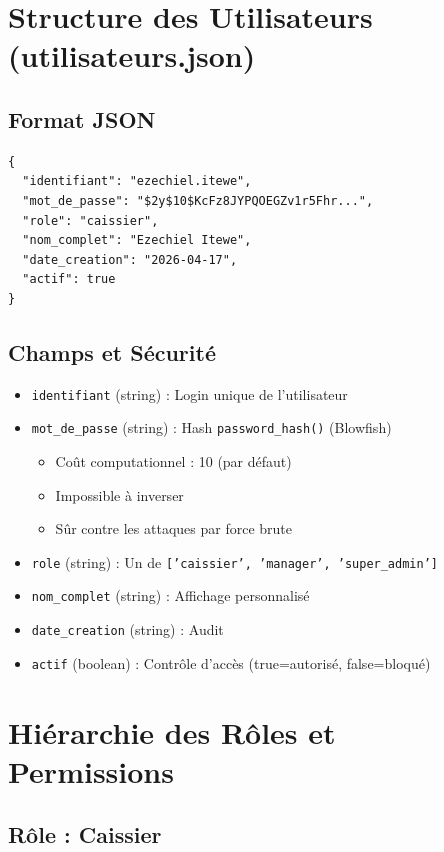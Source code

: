 \documentclass[12pt,a4paper]{report}
\begin{document}
\section{Structure des Utilisateurs (utilisateurs.json)}

\subsection{Format JSON}

\begin{lstlisting}
{
  "identifiant": "ezechiel.itewe",
  "mot_de_passe": "$2y$10$KcFz8JYPQOEGZv1r5Fhr...",
  "role": "caissier",
  "nom_complet": "Ezechiel Itewe",
  "date_creation": "2026-04-17",
  "actif": true
}
\end{lstlisting}

\subsection{Champs et Sécurité}

\begin{itemize}
    \item \texttt{identifiant} (string) : Login unique de l'utilisateur
    \item \texttt{mot\_de\_passe} (string) : Hash \texttt{password\_hash()} (Blowfish)
        \begin{itemize}
            \item Coût computationnel : 10 (par défaut)
            \item Impossible à inverser
            \item Sûr contre les attaques par force brute
        \end{itemize}
    \item \texttt{role} (string) : Un de \texttt{['caissier', 'manager', 'super\_admin']}
    \item \texttt{nom\_complet} (string) : Affichage personnalisé
    \item \texttt{date\_creation} (string) : Audit
    \item \texttt{actif} (boolean) : Contrôle d'accès (true=autorisé, false=bloqué)
\end{itemize}

\section{Hiérarchie des Rôles et Permissions}

\subsection{Rôle : Caissier}
\end{document}
